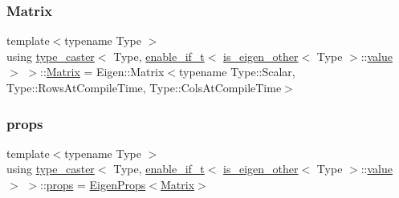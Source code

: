 \subsubsection{\texorpdfstring{Matrix}{Matrix}}
{\footnotesize\ttfamily template$<$typename Type $>$ \\
using \mbox{\hyperlink{classtype__caster}{type\+\_\+caster}}$<$ Type, \mbox{\hyperlink{detail_2common_8h_a012819c9e8b5e04872a271f50f8b8196}{enable\+\_\+if\+\_\+t}}$<$ \mbox{\hyperlink{eigen_8h_a7be1c6745b73821227ddafd46d41c583}{is\+\_\+eigen\+\_\+other}}$<$ Type $>$\+::\mbox{\hyperlink{_s_d_l__opengl__glext_8h_a8ad81492d410ff2ac11f754f4042150f}{value}} $>$ $>$\+::\mbox{\hyperlink{structtype__caster_3_01_type_00_01enable__if__t_3_01is__eigen__other_3_01_type_01_4_1_1value_01_4_01_4_a398c545dcd18f723905d9809fd2a5b8e}{Matrix}} =  Eigen\+::\+Matrix$<$typename Type\+::\+Scalar, Type\+::\+Rows\+At\+Compile\+Time, Type\+::\+Cols\+At\+Compile\+Time$>$\hspace{0.3cm}{\ttfamily [protected]}}

\mbox{\label{structtype__caster_3_01_type_00_01enable__if__t_3_01is__eigen__other_3_01_type_01_4_1_1value_01_4_01_4_abc2edf13189f5bca8a7159ca2c444598}} 
\subsubsection{\texorpdfstring{props}{props}}
{\footnotesize\ttfamily template$<$typename Type $>$ \\
using \mbox{\hyperlink{classtype__caster}{type\+\_\+caster}}$<$ Type, \mbox{\hyperlink{detail_2common_8h_a012819c9e8b5e04872a271f50f8b8196}{enable\+\_\+if\+\_\+t}}$<$ \mbox{\hyperlink{eigen_8h_a7be1c6745b73821227ddafd46d41c583}{is\+\_\+eigen\+\_\+other}}$<$ Type $>$\+::\mbox{\hyperlink{_s_d_l__opengl__glext_8h_a8ad81492d410ff2ac11f754f4042150f}{value}} $>$ $>$\+::\mbox{\hyperlink{structtype__caster_3_01_type_00_01enable__if__t_3_01is__eigen__other_3_01_type_01_4_1_1value_01_4_01_4_abc2edf13189f5bca8a7159ca2c444598}{props}} =  \mbox{\hyperlink{struct_eigen_props}{Eigen\+Props}}$<$\mbox{\hyperlink{structtype__caster_3_01_type_00_01enable__if__t_3_01is__eigen__other_3_01_type_01_4_1_1value_01_4_01_4_a398c545dcd18f723905d9809fd2a5b8e}{Matrix}}$>$\hspace{0.3cm}{\ttfamily [protected]}}




